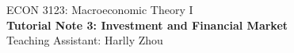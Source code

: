 \documentclass[12pt]{article}
\begin{document}
\begin{center}
    ECON 3123: Macroeconomic Theory I\\
    {\large \textbf{Tutorial Note 3: Investment and Financial Market}}\\
    Teaching Assistant: Harlly Zhou
\end{center}
\end{document}
